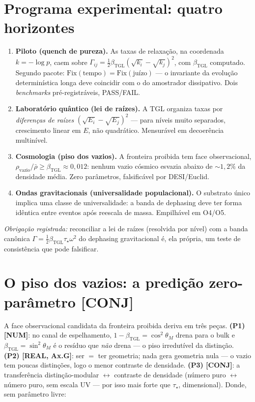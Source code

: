 \documentclass[11pt]{article}
\newcommand{\bTGL}{\beta_{\mathrm{TGL}}}\newcommand{\Msun}{M_{\odot}}\newcommand{\TGL}{\mathrm{TGL}}
\theoremstyle{definition}\newtheorem{deriv}{Derivação}
\begin{document}
\section{Programa experimental: quatro horizontes}\label{sec:horizontes}

\begin{enumerate}

\item \textbf{Piloto (quench de pureza).} As taxas de relaxação, na coordenada $k=-\log p$, caem sobre $\Gamma_{ij}=\tfrac12\bTGL(\sqrt{k_i}-\sqrt{k_j})^2$, com $\bTGL$ computado. Segundo pacote: $\mathrm{Fix}(\text{tempo})=\mathrm{Fix}(\text{juízo})$ --- o invariante da evolução determinística longa deve coincidir com o do amostrador dissipativo. Dois \emph{benchmarks} pré-registráveis, PASS/FAIL.

\item \textbf{Laboratório quântico (lei de raízes).} A TGL organiza taxas por \emph{diferenças de raízes} $(\sqrt{E_i}-\sqrt{E_j})^2$ --- para níveis muito separados, crescimento linear em $E$, não quadrático. Mensurável em decoerência multinível.

\item \textbf{Cosmologia (piso dos vazios).} A fronteira proibida tem face observacional, $\rho_{\mathrm{vazio}}/\bar\rho\geq\bTGL\approx0{,}012$: nenhum vazio cósmico esvazia abaixo de $\sim1{,}2\%$ da densidade média. Zero parâmetros, falsificável por DESI/Euclid.

\item \textbf{Ondas gravitacionais (universalidade populacional).} O substrato único implica uma classe de universalidade: a banda de dephasing deve ter forma idêntica entre eventos após reescala de massa. Empilhável em O4/O5.

\end{enumerate}

\emph{Obrigação registrada:} reconciliar a lei de raízes (resolvida por nível) com a banda canônica $\Gamma=\tfrac12\bTGL\tau_\star\omega^2$ do dephasing gravitacional é, ela própria, um teste de consistência que pode falsificar.

\section{O piso dos vazios: a predição zero-parâmetro \textsf{[CONJ]}}

A face observacional candidata da fronteira proibida deriva em três peças. \textbf{(P1) \textsf{[NUM]}}: no canal de espelhamento, $1-\bTGL=\cos^2\theta_M$ drena para o bulk e $\bTGL=\sin^2\theta_M$ é o resíduo que \emph{não} drena --- o piso irredutível da distinção. \textbf{(P2) \textsf{[REAL, Ax.G]}}: ser $=$ ter geometria; nada gera geometria nula --- o vazio tem poucas distinções, logo o menor contraste de densidade. \textbf{(P3) \textsf{[CONJ]}}: a transferência distinção-modular $\leftrightarrow$ contraste de densidade (número puro $\leftrightarrow$ número puro, sem escala UV --- por isso mais forte que $\tau_\star$, dimensional). Donde, sem parâmetro livre:
\end{document}
